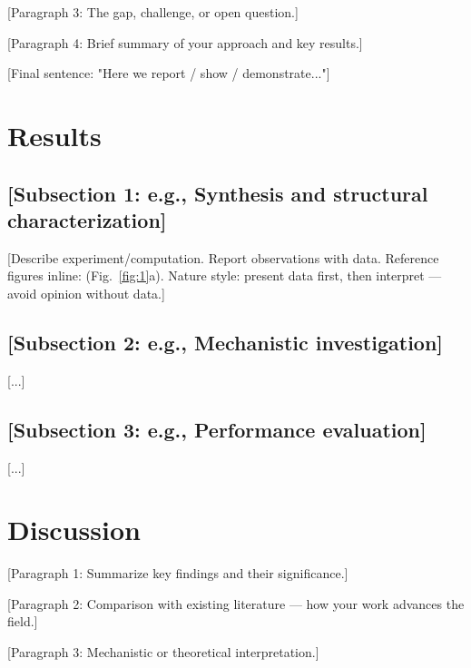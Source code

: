 \documentclass[9pt,twoside,lineno]{article}
\begin{document}
[Paragraph 3: The gap, challenge, or open question.]

[Paragraph 4: Brief summary of your approach and key results.]

[Final sentence: "Here we report / show / demonstrate..."]

\section*{Results}

\subsection*{[Subsection 1: e.g., Synthesis and structural characterization]}

[Describe experiment/computation. Report observations with data. 
Reference figures inline: (Fig.~\ref{fig:1}a). 
Nature style: present data first, then interpret — avoid opinion without data.]

\subsection*{[Subsection 2: e.g., Mechanistic investigation]}

[...]

\subsection*{[Subsection 3: e.g., Performance evaluation]}

[...]

\section*{Discussion}

[Paragraph 1: Summarize key findings and their significance.]

[Paragraph 2: Comparison with existing literature — how your work advances the field.]

[Paragraph 3: Mechanistic or theoretical interpretation.]
\end{document}
